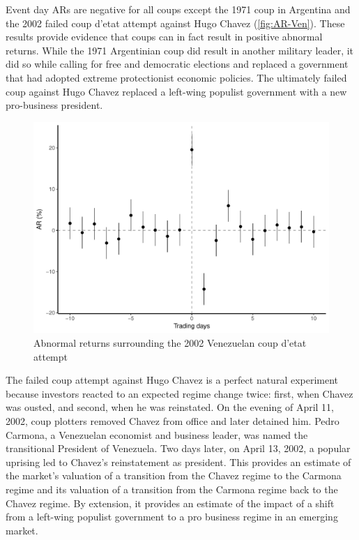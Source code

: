 \documentclass[12pt,final,fleqn]{article}
\theoremstyle{plain}
\begin{document}
Event day ARs are negative for all coups except the 1971 coup in Argentina and the 2002 failed coup d'etat attempt against Hugo Chavez (\autoref{fig:AR-Ven}). These results provide evidence that coups can in fact result in positive abnormal returns. While the 1971 Argentinian coup did result in another military leader, it did so while calling for free and democratic elections and replaced a government that had adopted extreme protectionist economic policies. The ultimately failed coup against Hugo Chavez replaced a left-wing populist government with a new pro-business president.

\begin{figure}[!ht]
\includegraphics{../figs/venezuela_coup_attempt_2002.pdf}
\caption{Abnormal returns surrounding the 2002 Venezuelan coup d'etat attempt}
\label{fig:AR-Ven}
\end{figure}

The failed coup attempt against Hugo Chavez is a perfect natural experiment because investors reacted to an expected regime change twice: first, when Chavez was ousted, and second, when he was reinstated. On the evening of April 11, 2002, coup plotters removed Chavez from office and later detained him. Pedro Carmona, a Venezuelan economist and business leader, was named the transitional President of Venezuela. Two days later, on April 13, 2002, a popular uprising led to Chavez's reinstatement as president. This provides an estimate of the market's valuation of a transition from the Chavez regime to the Carmona regime and its valuation of a transition from the Carmona regime back to the Chavez regime. By extension, it provides an estimate of the impact of a shift from a left-wing populist government to a pro business regime in an emerging market.
\end{document}
